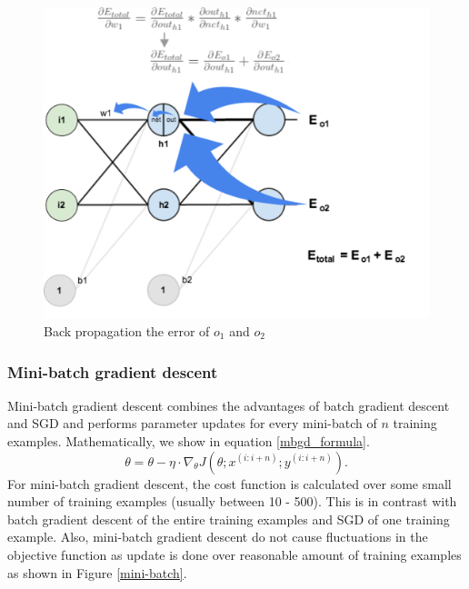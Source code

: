\documentclass[master]{thesis-uestc}
\begin{document}
\begin{figure}[ht]
\includegraphics[width=5in]{pic/nn-calculation.png}
\caption{Back propagation the error of $o_1$ and $o_2$}
\label{fig_nn-calculation}
\end{figure}

\subsubsection{Mini-batch gradient descent}
Mini-batch gradient descent combines the advantages of batch gradient descent and SGD and performs parameter updates for every mini-batch of $n$ training examples. Mathematically, we show in equation \ref{mbgd_formula}.
\begin{equation}
    \theta = \theta - \eta \cdot \nabla_\theta J(\theta; x^{(i:i+n)}; y^{(i:i+n)}).
\label{mbgd_formula}
\end{equation}
For mini-batch gradient descent, the cost function is calculated over some small number of training examples (usually between 10 - 500). This is in contrast with batch gradient descent of the entire training examples and SGD of one training example. Also, mini-batch gradient descent do not cause fluctuations in the objective function as update is done over reasonable amount of training examples as shown in Figure \ref{mini-batch}.
\end{document}
